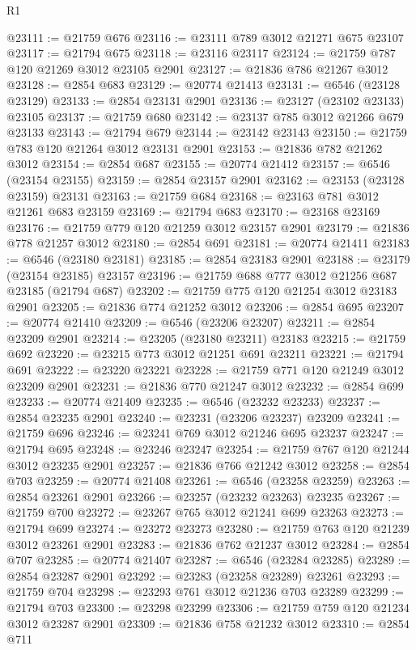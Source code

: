 \begin{lexlean}{R1}
\begin{coremodule}
@23111 := @21759 @676
@23116 := @23111 @789 @3012 @21271 @675 @23107
@23117 := @21794 @675
@23118 := @23116 @23117
@23124 := @21759 @787 @120 @21269 @3012 @23105 @2901
@23127 := @21836 @786 @21267 @3012
@23128 := @2854 @683
@23129 := @20774 @21413
@23131 := @6546 (@23128 @23129)
@23133 := @2854 @23131 @2901
@23136 := @23127 (@23102 @23133) @23105
@23137 := @21759 @680
@23142 := @23137 @785 @3012 @21266 @679 @23133
@23143 := @21794 @679
@23144 := @23142 @23143
@23150 := @21759 @783 @120 @21264 @3012 @23131 @2901
@23153 := @21836 @782 @21262 @3012
@23154 := @2854 @687
@23155 := @20774 @21412
@23157 := @6546 (@23154 @23155)
@23159 := @2854 @23157 @2901
@23162 := @23153 (@23128 @23159) @23131
@23163 := @21759 @684
@23168 := @23163 @781 @3012 @21261 @683 @23159
@23169 := @21794 @683
@23170 := @23168 @23169
@23176 := @21759 @779 @120 @21259 @3012 @23157 @2901
@23179 := @21836 @778 @21257 @3012
@23180 := @2854 @691
@23181 := @20774 @21411
@23183 := @6546 (@23180 @23181)
@23185 := @2854 @23183 @2901
@23188 := @23179 (@23154 @23185) @23157
@23196 := @21759 @688 @777 @3012 @21256 @687 @23185 (@21794 @687)
@23202 := @21759 @775 @120 @21254 @3012 @23183 @2901
@23205 := @21836 @774 @21252 @3012
@23206 := @2854 @695
@23207 := @20774 @21410
@23209 := @6546 (@23206 @23207)
@23211 := @2854 @23209 @2901
@23214 := @23205 (@23180 @23211) @23183
@23215 := @21759 @692
@23220 := @23215 @773 @3012 @21251 @691 @23211
@23221 := @21794 @691
@23222 := @23220 @23221
@23228 := @21759 @771 @120 @21249 @3012 @23209 @2901
@23231 := @21836 @770 @21247 @3012
@23232 := @2854 @699
@23233 := @20774 @21409
@23235 := @6546 (@23232 @23233)
@23237 := @2854 @23235 @2901
@23240 := @23231 (@23206 @23237) @23209
@23241 := @21759 @696
@23246 := @23241 @769 @3012 @21246 @695 @23237
@23247 := @21794 @695
@23248 := @23246 @23247
@23254 := @21759 @767 @120 @21244 @3012 @23235 @2901
@23257 := @21836 @766 @21242 @3012
@23258 := @2854 @703
@23259 := @20774 @21408
@23261 := @6546 (@23258 @23259)
@23263 := @2854 @23261 @2901
@23266 := @23257 (@23232 @23263) @23235
@23267 := @21759 @700
@23272 := @23267 @765 @3012 @21241 @699 @23263
@23273 := @21794 @699
@23274 := @23272 @23273
@23280 := @21759 @763 @120 @21239 @3012 @23261 @2901
@23283 := @21836 @762 @21237 @3012
@23284 := @2854 @707
@23285 := @20774 @21407
@23287 := @6546 (@23284 @23285)
@23289 := @2854 @23287 @2901
@23292 := @23283 (@23258 @23289) @23261
@23293 := @21759 @704
@23298 := @23293 @761 @3012 @21236 @703 @23289
@23299 := @21794 @703
@23300 := @23298 @23299
@23306 := @21759 @759 @120 @21234 @3012 @23287 @2901
@23309 := @21836 @758 @21232 @3012
@23310 := @2854 @711

\end{coremodule}
\end{lexlean}

